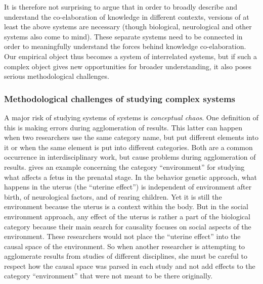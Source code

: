 \documentclass[output=paper]{langscibook}
\begin{document}
It is therefore not surprising to argue that in order to broadly describe and understand the co-elaboration of knowledge in different contexts, versions of at least the above systems are necessary (though biological, neurological and other systems also come to mind). These separate systems need to be connected in order to meaningfully understand the forces behind knowledge co-elaboration. Our empirical object thus becomes a system of interrelated systems, but if such a complex object gives new opportunities for broader understanding, it also poses serious methodological challenges. 


 \subsubsection{Methodological challenges of studying complex systems}

A major risk of studying systems of systems is \textit{conceptual chaos}. One definition of this is making errors during agglomeration of results. This latter can happen when two researchers use the same category name, but put different elements into it or when the same element is put into different categories. Both are a common occurrence in interdisciplinary work, but cause problems during agglomeration of results. \citet{Longino2013} gives an example concerning the category “environment” for studying what affects a fetus in the prenatal stage. In the behavior genetic approach, what happens in the uterus (the “uterine effect”) is independent of environment after birth, of neurological factors, and of rearing children. Yet it is still the environment because the uterus is a context within the body. But in the social environment approach, any effect of the uterus is rather a part of the biological category because their main search for causality focuses on social aspects of the environment. These researchers would not place the “uterine effect” into the causal space of the environment. So when another researcher is attempting to agglomerate results from studies of different disciplines, she must be careful to respect how the causal space was parsed in each study and not add effects to the category “environment” that were not meant to be there originally.
\end{document}
